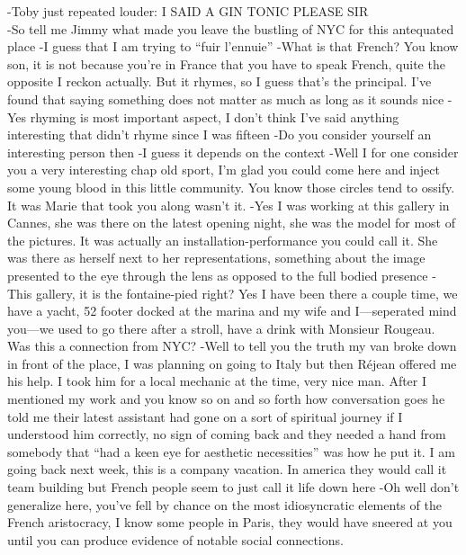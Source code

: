 \hfill\small{-Toby just repeated louder: I SAID A GIN TONIC PLEASE SIR}\\ -So
tell me Jimmy what made you leave the bustling of NYC for this antequated place
-I guess that I am trying to “fuir l’ennuie” -What is that French? You know
son, it is not because you’re in France that you have to speak French, quite
the opposite I reckon actually. But it rhymes, so I guess that’s the principal.
I’ve found that saying something does not matter as much as long as it sounds
nice -Yes rhyming is most important aspect, I don’t think I’ve said anything
interesting that didn’t rhyme since I was fifteen -Do you consider yourself an
interesting person then -I guess it depends on the context -Well I for one
consider you a very interesting chap old sport, I’m glad you could come here
and inject some young blood in this little community. You know those circles
tend to ossify. It was Marie that took you along wasn’t it.  -Yes I was working
at this gallery in Cannes, she was there on the latest opening night, she was
the model for most of the pictures. It was actually an installation-performance
you could call it. She was there as herself next to her representations,
something about the image presented to the eye through the lens as opposed to
the full bodied presence -This gallery, it is the fontaine-pied right? Yes I
have been there a couple time, we have a yacht, 52 footer docked at the marina
and my wife and I—seperated mind you—we used to go there after a stroll, have a
drink with Monsieur Rougeau. Was this a connection from NYC?  -Well to tell you
the truth my van broke down in front of the place, I was planning on going to
Italy but then Réjean offered me his help. I took him for a local mechanic at
the time, very nice man. After I mentioned my work and you know so on and so
forth how conversation goes he told me their latest assistant had gone on a
sort of spiritual journey if I understood him correctly, no sign of coming back
and they needed a hand from somebody that “had a keen eye for aesthetic
necessities” was how he put it. I am going back next week, this is a company
vacation. In america they would call it team building but French people seem to
just call it life down here -Oh well don’t generalize here, you’ve fell by
chance on the most idiosyncratic elements of the French aristocracy, I know
some people in Paris, they would have sneered at you until you can produce
evidence of notable social connections. 



